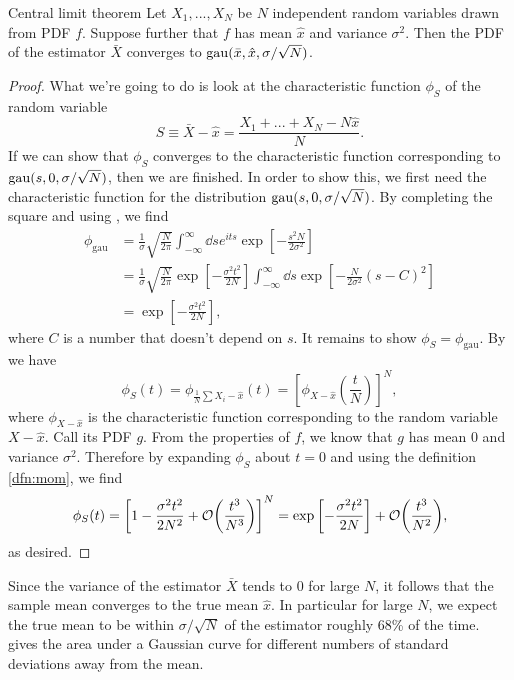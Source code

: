 \begin{theorem}{Central limit theorem}{}
  Let $X_1,...,X_N$ be $N$ independent random variables drawn from PDF $f$.
  Suppose further that $f$ has mean $\hat{x}$ and variance $\sigma^2$. 
  Then the PDF of the estimator $\bar{X}$ converges to 
  $\operatorname{gau}(\bar{x},\hat{x},\sigma/\sqrt{N})$.
  \begin{proof}
    What we're going to do is look at the characteristic function 
    $\phi_S$ of the random variable
    $$
      S\equiv\bar{X}-\hat{x}=\frac{X_1+...+X_N-N\hat{x}}{N}.
    $$
    If we can show that $\phi_S$ converges to the characteristic function
    corresponding to $\operatorname{gau}(s,0,\sigma/\sqrt{N})$, then we are finished.
    In order to show this, we first need the characteristic function for
    the distribution $\operatorname{gau}(s,0,\sigma/\sqrt{N})$. By completing the
    square and using , we find 
    \begin{equation*}
      \begin{aligned}
        \phi_{\text{gau}}
            &=\frac{1}{\sigma}\sqrt{\frac{N}{2\pi}}\int_{-\infty}^\infty\dd{s}
              e^{its}\exp\left[-\frac{s^2N}{2\sigma^2}\right]\\
            &=\frac{1}{\sigma}\sqrt{\frac{N}{2\pi}}
              \exp\left[-\frac{\sigma^2t^2}{2N}\right]
              \int_{-\infty}^\infty\dd{s}
              \exp\left[-\frac{N}{2\sigma^2}(s-C)^2\right]\\
            &=\exp\left[-\frac{\sigma^2t^2}{2N}\right],
      \end{aligned}
    \end{equation*}
    where $C$ is a number that doesn't depend on $s$. It remains to show 
    $\phi_S=\phi_{\text{gau}}$. By  we have
    $$
      \phi_S(t)=\phi_{\frac{1}{N}\sum X_i-\hat{x}}(t)
               =\left[\phi_{X-\hat{x}}\left(\frac{t}{N}\right)\right]^N,
    $$
    where $\phi_{X-\hat{x}}$ is the characteristic function corresponding
    to the random variable $X-\hat{x}$. Call its PDF $g$. From the
    properties of $f$, we know that $g$ has mean 0 and variance $\sigma^2$.
    Therefore by expanding $\phi_S$ about $t=0$ and using the 
    definition \eqref{dfn:mom}, we find
    $$
      \phi_S(t)=\left[1-\frac{\sigma^2t^2}{2N^2}
             +\order{\frac{t^3}{N^3}}\right]^N
               =\exp\left[-\frac{\sigma^2t^2}{2N}\right]
             +\order{\frac{t^3}{N^2}},
    $$
    as desired.
  \end{proof}
\end{theorem}
Since the variance of the estimator $\bar{X}$ tends to 0 for large $N$,
it follows that the sample mean converges to the true mean $\hat{x}$.
In particular for large $N$, we expect the true mean to be within
$\sigma/\sqrt{N}$ of the estimator roughly 68\% of the time.
 gives the area under a Gaussian curve 
for different numbers of standard deviations away from the mean. 

